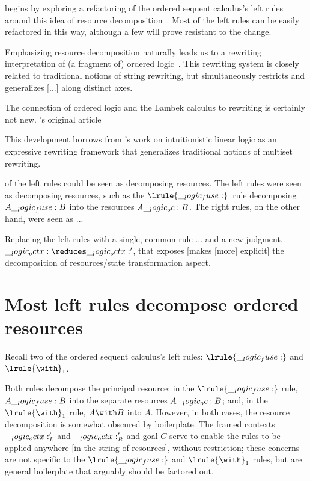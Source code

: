 begins by exploring a refactoring of the ordered sequent calculus's left rules around this idea of resource decomposition~.
Most of the left rules can be easily refactored in this way, although a few will prove resistant to the change.

Emphasizing resource decomposition naturally leads us to a rewriting interpretation of (a fragment of) ordered logic~.
This rewriting system is closely related to traditional notions of string rewriting\autocite{??}, but simultaneously restricts and generalizes [...] along distinct axes.

The connection of ordered logic and the Lambek calculus to rewriting is certainly not new.
's original article\autocite{Lambek:AMM58}

This development borrows from \citeauthor{Cervesato+Scedrov:IC09}'s work on intuitionistic linear logic as an expressive rewriting framework that generalizes traditional notions of multiset rewriting.\autocite{Cervesato+Scedrov:IC09}



 of the left rules could be seen as decomposing resources.
The left rules were seen as decomposing resources, such as the $\lrule{\fuse}$~rule%
decomposing $A \__logic_fuse: B$ into the resources $A \__logic_oc: B$.
The right rules, on the other hand, were seen as ...

Replacing the left rules with a single, common rule ... and a new judgment, $\octx \reduces \octx'$, that exposes [makes [more] explicit] the decomposition of resources/state transformation aspect.


\section{Most left rules decompose ordered resources}

Recall two of the ordered sequent calculus's left rules: $\lrule{\fuse}$ and $\lrule{\with}_1$.
Both rules decompose the principal resource: in the $\lrule{\fuse}$ rule, $A \__logic_fuse: B$ into the separate resources $A \__logic_oc: B$; and, in the $\lrule{\with}_1$ rule, $A \with B$ into $A$.
However, in both cases, the resource decomposition is somewhat obscured by boilerplate.
The framed contexts $\__logic_octx:'_L$ and $\__logic_octx:'_R$ and goal $C$ serve to enable the rules to be applied anywhere [in the string of resources], without restriction;
these concerns are not specific to the $\lrule{\fuse}$ and $\lrule{\with}_1$ rules, but are general boilerplate that arguably should be factored out.

